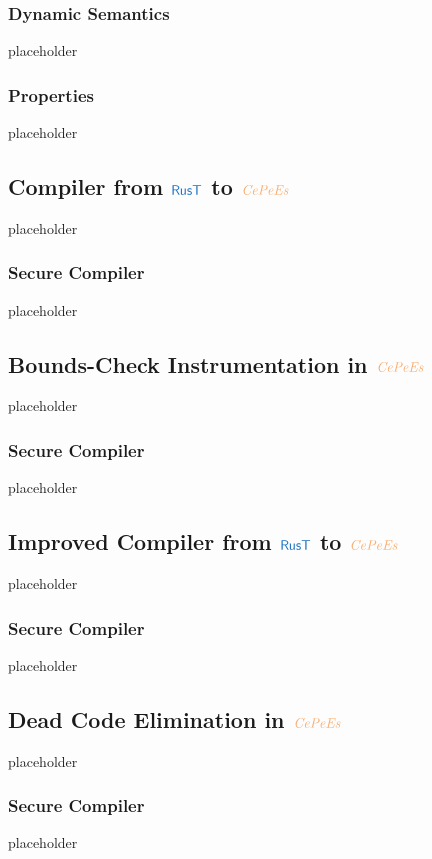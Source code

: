 \documentclass[a4paper,12pt]{article}
\begin{document}
\subsubsection{Dynamic Semantics}\label{subsec-cepees-dynamic}
placeholder
\subsubsection{Properties}\label{subsec-cepees-properties}
placeholder


\subsection{Compiler from $\src{RusT}$ to $\irl{CePeEs}$}\label{subsec-rust-to-cepees}
placeholder
\subsubsection{Secure Compiler}\label{subsec-rust-to-cepees-seccomp}
placeholder

\subsection{Bounds-Check Instrumentation in $\irl{CePeEs}$}\label{subsec-softbounds-in-cepees}
placeholder
\subsubsection{Secure Compiler}\label{subsec-softbounds-cepees-seccomp}
placeholder

\subsection{Improved Compiler from $\src{RusT}$ to $\irl{CePeEs}$}\label{subsec-improved-rust-to-cepees}
placeholder
\subsubsection{Secure Compiler}\label{subsec-improved-rust-to-cepees-seccomp}
placeholder

\subsection{Dead Code Elimination in $\irl{CePeEs}$}\label{subsec-dce-in-cepees}
placeholder
\subsubsection{Secure Compiler}\label{subsec-dce-cepees-seccomp}
placeholder
\end{document}
